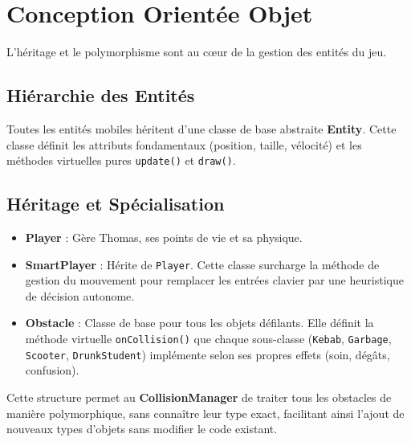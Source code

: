 \section{Conception Orientée Objet}

L'héritage et le polymorphisme sont au cœur de la gestion des entités du jeu.

\subsection{Hiérarchie des Entités}
Toutes les entités mobiles héritent d'une classe de base abstraite \textbf{Entity}. Cette classe définit les attributs fondamentaux (position, taille, vélocité) et les méthodes virtuelles pures \texttt{update()} et \texttt{draw()}.

\subsection{Héritage et Spécialisation}
\begin{itemize}
    \item \textbf{Player} : Gère Thomas, ses points de vie et sa physique. 
    \item \textbf{SmartPlayer} : Hérite de \texttt{Player}. Cette classe surcharge la méthode de gestion du mouvement pour remplacer les entrées clavier par une heuristique de décision autonome.
    \item \textbf{Obstacle} : Classe de base pour tous les objets défilants. Elle définit la méthode virtuelle \texttt{onCollision()} que chaque sous-classe (\texttt{Kebab}, \texttt{Garbage}, \texttt{Scooter}, \texttt{DrunkStudent}) implémente selon ses propres effets (soin, dégâts, confusion).
\end{itemize}

Cette structure permet au \textbf{CollisionManager} de traiter tous les obstacles de manière polymorphique, sans connaître leur type exact, facilitant ainsi l'ajout de nouveaux types d'objets sans modifier le code existant.
